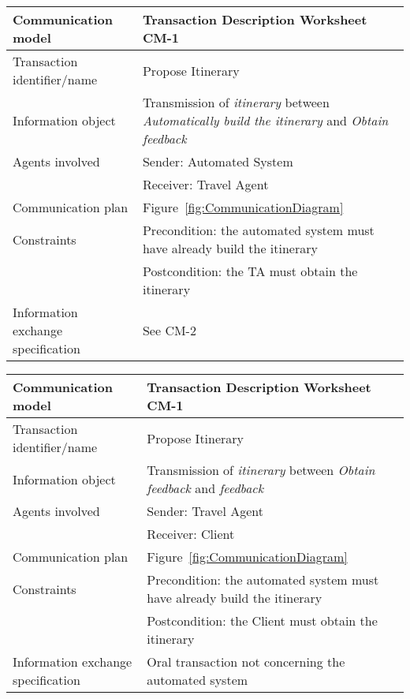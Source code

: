 \newline
\vspace{0.8 cm}
\newline
\noindent
\begin{tabular}%
		{|p{3cm}%
        |p{9cm}|}
\hline
{\bf Communication model} &
   {\bf Transaction Description Worksheet CM-1} \\
\hline
\hline
\sc Transaction identifier/name &
   {\rm Propose Itinerary } \\
\hline
\sc Information object &
   {\rm
   Transmission of \textit{itinerary} between \textit{Automatically build the itinerary} and \textit{Obtain feedback}
   } \\
\hline
\sc Agents involved &
	{\rm Sender: Automated System} \\
	& {\rm Receiver: Travel Agent}\\
\hline
\sc Communication plan &
   {\rm
   Figure~\ref{fig:CommunicationDiagram}
   } \\
\hline
\sc Constraints &
   {\rm Precondition: the automated system must have already build the itinerary}\\
	& {\rm Postcondition: the TA must obtain the itinerary } \\
\hline
\sc Information exchange specification &
   {\rm
   See CM-2 
   } \\
\hline
\end{tabular}
\newline
\vspace{0.8 cm}
\newline
\noindent
\begin{tabular}%
      {|p{3cm}%
        |p{9cm}|}
\hline
{\bf Communication model} &
   {\bf Transaction Description Worksheet CM-1} \\
\hline
\hline
\sc Transaction identifier/name &
   {\rm Propose Itinerary } \\
\hline
\sc Information object &
   {\rm
   Transmission of \textit{itinerary} between \textit{Obtain feedback} and \textit{feedback}
   } \\
\hline
\sc Agents involved &
   {\rm Sender: Travel Agent} \\
   & {\rm Receiver: Client}\\
\hline
\sc Communication plan &
   {\rm
   Figure~\ref{fig:CommunicationDiagram}
   } \\
\hline
\sc Constraints &
   {\rm Precondition: the automated system must have already build the itinerary}\\
   & {\rm Postcondition: the Client must obtain the itinerary } \\
\hline
\sc Information exchange specification &
   {\rm
   Oral transaction not concerning the automated system
   } \\
\hline
\end{tabular}
